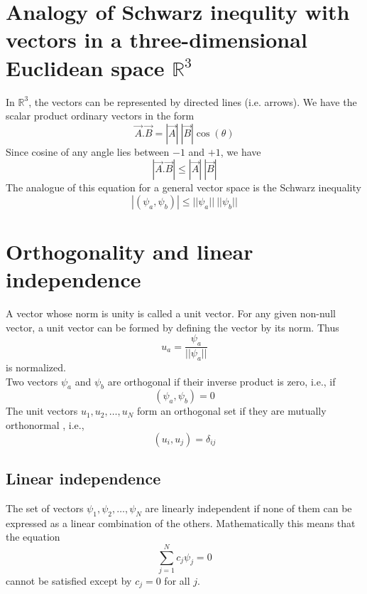 \section{Analogy of Schwarz inequlity with vectors in a three-dimensional Euclidean space $\mathbb{R}^3$}
In $\mathbb{R}^3$, the vectors can be represented by directed lines (i.e. arrows). We have the scalar product ordinary vectors in the form
\begin{equation}\label{eqn:2.65}
\vec{A} . \vec{B} = |\vec{A}| \ |\vec{B}| \cos(\theta)
\end{equation}
Since cosine of any angle lies between $-1$ and $+1$, we have
\begin{equation}\label{eqn:2.66}
|\vec{A} . \vec{B} | \leq |\vec{A}| \ |\vec{B}|
\end{equation}
The analogue of this equation for a general vector space is the Schwarz inequality
\begin{equation}\label{eqn:2.67}
|(\psi_a, \psi_b)| \leq ||\psi_a|| \ ||\psi_b||
\end{equation}


\section{Orthogonality and linear independence}
A vector whose norm is unity is called a unit vector. For any given non-null vector, a unit vector can be formed by defining the vector by its norm. Thus
\begin{equation}\label{eqn:2.68}
u_a = \frac{\psi_a}{||\psi_a||}
\end{equation}
is normalized.\\
Two vectors $\psi_a$ and $\psi_b$ are orthogonal if their inverse product is zero, i.e., if
\begin{equation}\label{eqn:2.69}
(\psi_a, \psi_b ) = 0
\end{equation}
The unit vectors $u_1, u_2, \ldots, u_N$ form an orthogonal set if they are mutually orthonormal , i.e., 
\begin{equation}\label{eqn:2.70}
(u_i, u_j) = \delta_{ij}
\end{equation}

\subsection{Linear independence}
The set of vectors $\psi_1, \psi_2, \ldots, \psi_N$ are linearly independent if none of them can be expressed as a linear combination of the others. Mathematically this means that the equation
\begin{equation}\label{eqn:2.71}
\sum_{j=1}^{N} c_j \psi_j = 0
\end{equation}	
cannot be satisfied except by $c_j = 0$ for all $j$.

